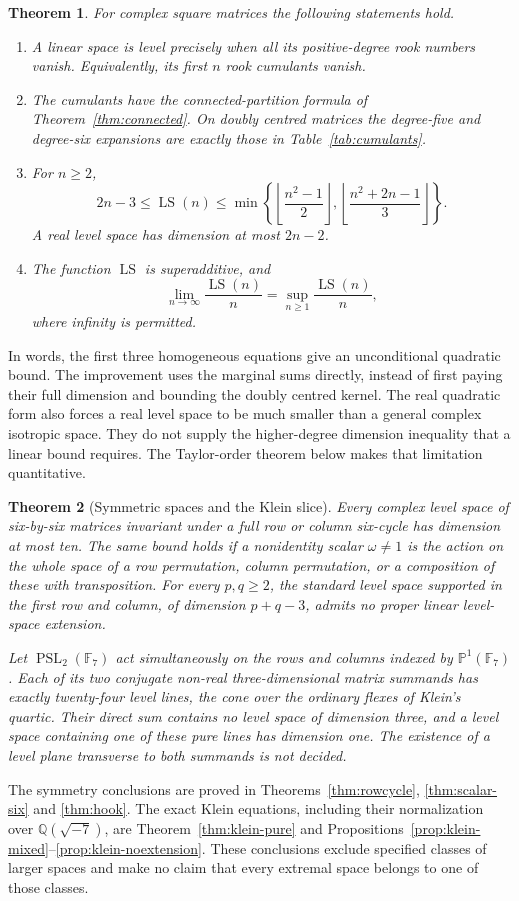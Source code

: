 \documentclass[11pt]{article}
\newcommand{\LS}{\operatorname{LS}}
\newtheorem{theorem}{Theorem}[section]
\theoremstyle{definition}
\theoremstyle{remark}
\begin{document}
\begin{theorem}\label{thm:summary}
For complex square matrices the following statements hold.
\begin{enumerate}
\item A linear space is level precisely when all its positive-degree rook numbers vanish. Equivalently, its first $n$ rook cumulants vanish.
\item The cumulants have the connected-partition formula of Theorem~\ref{thm:connected}. On doubly centred matrices the degree-five and degree-six expansions are exactly those in Table~\ref{tab:cumulants}.
\item For $n\geq2$,
\[
 2n-3\leq\LS(n)\leq
 \min\left\{\left\lfloor\frac{n^2-1}{2}\right\rfloor,
 \left\lfloor\frac{n^2+2n-1}{3}\right\rfloor\right\}.
\]
A real level space has dimension at most $2n-2$.
\item The function $\LS$ is superadditive, and
\[
 \lim_{n\to\infty}\frac{\LS(n)}n
 =\sup_{n\geq1}\frac{\LS(n)}n,
\]
where infinity is permitted.
\end{enumerate}
\end{theorem}

In words, the first three homogeneous equations give an unconditional quadratic bound. The improvement uses the marginal sums directly, instead of first paying their full dimension and bounding the doubly centred kernel. The real quadratic form also forces a real level space to be much smaller than a general complex isotropic space. They do not supply the higher-degree dimension inequality that a linear bound requires. The Taylor-order theorem below makes that limitation quantitative.


\begin{theorem}[Symmetric spaces and the Klein slice]\label{thm:symmetric-summary}
Every complex level space of six-by-six matrices invariant under a full row or column six-cycle has dimension at most ten. The same bound holds if a nonidentity scalar $\omega\ne1$ is the action on the whole space of a row permutation, column permutation, or a composition of these with transposition. For every $p,q\ge2$, the standard level space supported in the first row and column, of dimension $p+q-3$, admits no proper linear level-space extension.

Let $\operatorname{PSL}_2(\mathbb F_7)$ act simultaneously on the rows and columns indexed by $\mathbb P^1(\mathbb F_7)$. Each of its two conjugate non-real three-dimensional matrix summands has exactly twenty-four level lines, the cone over the ordinary flexes of Klein's quartic. Their direct sum contains no level space of dimension three, and a level space containing one of these pure lines has dimension one. The existence of a level plane transverse to both summands is not decided.
\end{theorem}
The symmetry conclusions are proved in Theorems~\ref{thm:rowcycle}, \ref{thm:scalar-six} and \ref{thm:hook}. The exact Klein equations, including their normalization over $\mathbb Q(\sqrt{-7})$, are Theorem~\ref{thm:klein-pure} and Propositions~\ref{prop:klein-mixed}--\ref{prop:klein-noextension}. These conclusions exclude specified classes of larger spaces and make no claim that every extremal space belongs to one of those classes.
\end{document}
